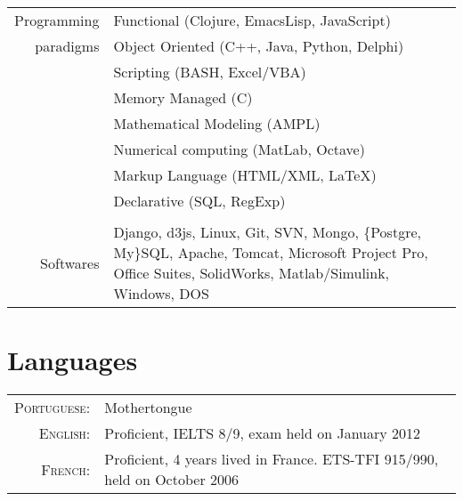 \documentclass[a4paper,10pt]{article} %
\begin{document}
\begin{tabular}{rp{11cm}}
Programming & Functional (Clojure, EmacsLisp, JavaScript)\\
paradigms & Object Oriented (C++, Java, Python, Delphi)\\
& Scripting (BASH, Excel/VBA)\\
& Memory Managed (C)\\
& Mathematical Modeling (AMPL) \\
& Numerical computing (MatLab, Octave) \\
& Markup Language (HTML/XML, LaTeX) \\
& Declarative (SQL, RegExp) \\

&\\

Softwares & Django, d3js, Linux, Git, SVN, Mongo, \{Postgre, My\}SQL,
Apache, Tomcat, Microsoft Project Pro, Office Suites, SolidWorks,
Matlab/Simulink, Windows, DOS \\




\end{tabular}


\section{Languages}

\begin{tabular}{rl}
\textsc{Portuguese:} & Mothertongue\\

\textsc{English:} & Proficient, IELTS 8/9, exam held on January 2012\\

\textsc{French:} & Proficient, 4 years lived in France. ETS-TFI
915/990, held on October 2006\\



\end{tabular}
\end{document}
